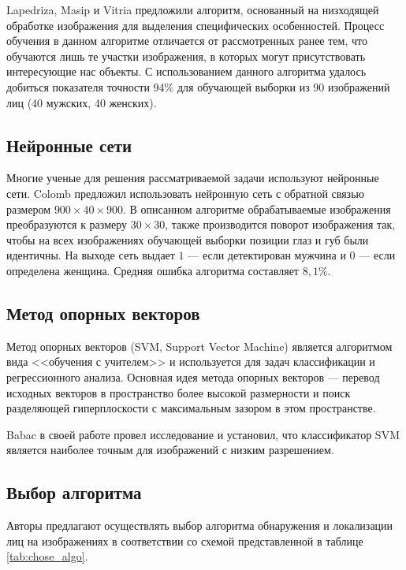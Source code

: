 Lapedriza, Masip и Vitria \cite{Lapedriza_Masip_Vitria} предложили алгоритм,
основанный на низходящей обработке изображения для выделения специфических
особенностей. Процесс обучения в данном алгоритме отличается от рассмотренных
ранее тем, что обучаются лишь те участки изображения, в которых могут
присутствовать интересующие нас объекты. С использованием данного алгоритма
удалось добиться показателя точности 94\% для обучающей выборки из 90
изображений лиц (40 мужских, 40 женских).


\subsection{Нейронные сети}
Многие ученые для решения рассматриваемой задачи используют нейронные сети.
Colomb \cite{Colomb} предложил использовать нейронную сеть с обратной связью
размером $900\times40\times900$. В описанном алгоритме обрабатываемые
изображения преобразуются к размеру $30\times30$, также производится поворот
изображения так, чтобы на всех изображениях обучающей выборки позиции глаз и губ
были идентичны. На выходе сеть выдает $1$ --- если детектирован мужчина и $0$
--- если определена женщина. Средняя ошибка алгоритма \cite{Colomb} составляет
$8,1\%$.  

\subsection{Метод опорных векторов}
Метод опорных векторов (SVM, Support Vector Machine) является алгоритмом вида
<<обучения с учителем>> и используется для задач классификации и регрессионного
анализа. Основная идея метода опорных векторов --- перевод исходных векторов в
пространство более высокой размерности и поиск разделяющей гиперплоскости с
максимальным зазором в этом пространстве. 

Babac в своей работе \cite{Babac} провел исследование и установил, что
классификатор SVM является наиболее точным для изображений с низким
разрешением.


\subsection{Выбор алгоритма}
Авторы \cite{Veznevec_Degtyareva} предлагают осуществлять выбор алгоритма
обнаружения и локализации лиц на изображениях в соответствии со схемой
представленной в таблице \ref{tab:chose_algo}.

